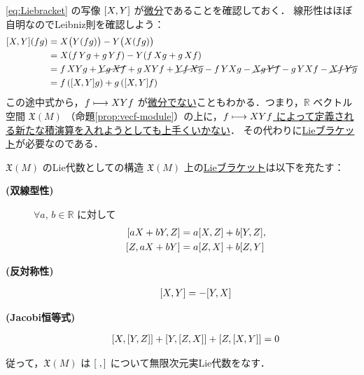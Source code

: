 \documentclass[geometry_main]{subfiles}
\begin{document}
\eqref{eq:Liebracket} の写像 $\comm{X}{Y}$ が\hyperref[prop:vecf-derivation]{微分}であることを確認しておく．
線形性はほぼ自明なのでLeibniz則を確認しよう：
\begin{align}
    \comm{X}{Y}(fg) &= X \bigl( Y(fg) \bigr) - Y \bigl( X(fg) \bigr) \\
    &= X(f\, Yg + g\, Yf) - Y(f\, Xg + g\, Xf) \\
    &= f\, XYg + \cancel{Yg\, Xf} + g\, XYf + \cancel{Yf\, Xg} - f\, YXg - \cancel{Xg\, Yf} - g\, YXf - \cancel{Xf\, Yg} \\
    &= f\, (\comm{X}{Y}g) + g\, (\comm{X}{Y}f)
\end{align}
この途中式から，$f \longmapsto XY f$ が\underline{微分でない}こともわかる．つまり，$\mathbb{R}$ ベクトル空間 $\mathfrak{X}(M)$ （命題\ref{prop:vecf-module}）の上に，\underline{$f \longmapsto XYf$ によって定義される新たな積演算を入れようとしても上手くいかない}．
その代わりに\hyperref[def:Lie-bracket]{Lieブラケット}が必要なのである．

\begin{myprop}[label=prop:vecf-Liealg]{$\mathfrak{X}(M)$ のLie代数としての構造}
    $\mathfrak{X}(M)$ 上の\hyperref[def:Lie-bracket]{Lieブラケット}は以下を充たす：
    \begin{description}
        \item[\textbf{(双線型性)}] $\forall a,\, b \in \mathbb{R}$ に対して
        \begin{align}
            \comm{aX + bY}{Z} &= a\comm{X}{Z} + b \comm{Y}{Z}, \\
            \comm{Z}{aX + bY} &= a\comm{Z}{X} + b \comm{Z}{Y}
        \end{align}
        \item[\textbf{(反対称性)}] \begin{align}
            \comm{X}{Y} = - \comm{Y}{X}
        \end{align}
        \item[\textbf{(Jacobi恒等式)}] \begin{align}
            \comm{X}{\comm{Y}{Z}} + \comm{Y}{\comm{Z}{X}} + \comm{Z}{\comm{X}{Y}} = 0
        \end{align}        
    \end{description}
    従って，$\mathfrak{X}(M)$ は $\comm{\;}{\,}$ について無限次元実Lie代数をなす．
\end{myprop}
\end{document}
